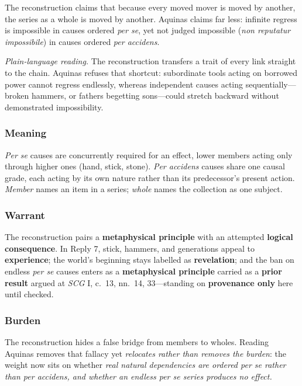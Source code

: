 The reconstruction claims that because every moved mover is moved by another, the series as a whole is moved by another. Aquinas claims far less: infinite regress is impossible in causes ordered \emph{per se}, yet not judged impossible (\emph{non reputatur impossibile}) in causes ordered \emph{per accidens}.

\emph{Plain-language reading.} The reconstruction transfers a trait of every link straight to the chain. Aquinas refuses that shortcut: subordinate tools acting on borrowed power cannot regress endlessly, whereas independent causes acting sequentially---broken hammers, or fathers begetting sons---could stretch backward without demonstrated impossibility.

\subsubsection*{Meaning}

\emph{Per se} causes are concurrently required for an effect, lower members acting only through higher ones (hand, stick, stone). \emph{Per accidens} causes share one causal grade, each acting by its own nature rather than its predecessor's present action. \emph{Member} names an item in a series; \emph{whole} names the collection as one subject.

\subsubsection*{Warrant}

The reconstruction pairs a \textbf{metaphysical principle} with an attempted \textbf{logical consequence}. In Reply 7, stick, hammers, and generations appeal to \textbf{experience}; the world's beginning stays labelled as \textbf{revelation}; and the ban on endless \emph{per se} causes enters as a \textbf{metaphysical principle} carried as a \textbf{prior result} argued at \emph{SCG} I, c.\ 13, nn.\ 14, 33---standing on \textbf{provenance only} here until checked.

\subsubsection*{Burden}

The reconstruction hides a false bridge from members to wholes. Reading Aquinas removes that fallacy yet \emph{relocates rather than removes the burden}: the weight now sits on whether \emph{real natural dependencies are ordered per se rather than per accidens, and whether an endless per se series produces no effect.}

